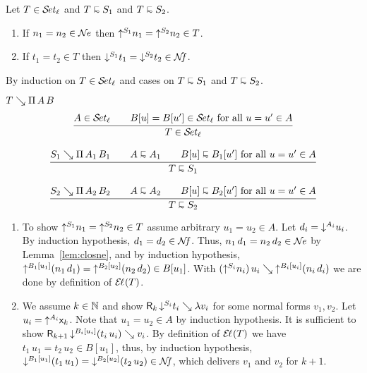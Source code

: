 \documentclass[acmlarge,review,anonymous]{acmart}\settopmatter{printfolios=true}
\makeatletter
\newenvironment{proof*}[1][\proofname]{\par
  \normalfont \topsep6\p@\@plus6\p@\relax
  \trivlist
  \item[\@proofindent\hskip\labelsep
        {\@proofnamefont #1\@addpunct{.}}]\ignorespaces
}{%
  \endtrivlist\@endpefalse
}
\makeatother
\begin{document}
\begin{theorem}
\label{thm:rere}
Let $T \in \SET[\ell]$ and $T \shape S_1$ and $T \shape S_2$.
\begin{enumerate}
\item If\/ $n_1 = n_2 \in \NE$ then $\up{S_1}{n_1} = \up{S_2}{n_2} \in T$.
\item If\/ $t_1 = t_2 \in T$ then $\down{S_1}{t_1} = \down{S_2}{t_2} \in \NF$.
\end{enumerate}
\end{theorem}
\begin{proof*}
By induction on $T \in \SET[\ell]$ and cases on $T \shape S_1$ and $T \shape S_2$.
\begin{caselist}

\nextcase $T \evalsto \piT A B$
\begin{gather*}
  \ru{A \in \SET[\ell] \qquad
      B[u] = B[u'] \in \SET[\ell] \mforall u = u' \in A
    }{T \in \SET[\ell]}
\\[2ex]
  \ru{S_1 \evalsto \piT{A_1}{B_1} \qquad
      A \shape A_1 \qquad
      B[u] \shape B_1[u'] \mforall u = u' \in A
    }{T \shape S_1}
\\[2ex]
  \ru{S_2 \evalsto \piT{A_2}{B_2} \qquad
      A \shape A_2 \qquad
      B[u] \shape B_2[u'] \mforall u = u' \in A
    }{T \shape S_2}
\end{gather*}
\begin{enumerate}
\item To show $\up{S_1}{n_1} = \up{S_2}{n_2} \in T$ assume arbitrary $u_1 = u_2 \in A$.
  Let $d_i = \down{A_i}{u_i}$.
  By induction hypothesis, $d_1 = d_2 \in \NF$.
  Thus, $n_1\,d_1 = n_2\,d_2 \in \NE$ by Lemma~\ref{lem:closne}, and
  by induction hypothesis,  $\up{B_1[u_1]}(n_1\,d_1) = \up{B_2[u_2]}(n_2\,d_2) \in B[u_1]$.
  With $(\up{S_i}{n_i})\,u_i \evalsto \up{B_i[u_i]}(n_i\,d_i)$ we are done by definition of $\EL(T)$.

\item We assume $k \in \NN$ and show $\R k {\down{S_i}{t_i}} \lambda v_i$ for some normal forms
$v_1,v_2$.  Let $u_i = \up{A_i} \lev k$.  Note that $u_1 = u_2 \in A$ by induction hypothesis.
It is sufficient to show
$\R{k+1}{\down{B_i[u_i]}{(t_i\,u_i)}} {v_i}$.
By definition of $\EL(T)$ we have $t_1\,u_1 = t_2\,u_2 \in B[u_1]$, thus, by induction hypothesis,
$\down{B_1[u_1]}(t_1\,u_1) = \down{B_2[u_2]}(t_2\,u_2) \in \NF$, which delivers $v_1$ and $v_2$ for $k+1$.
\end{enumerate}


\end{caselist}
\end{proof*}
\end{document}
